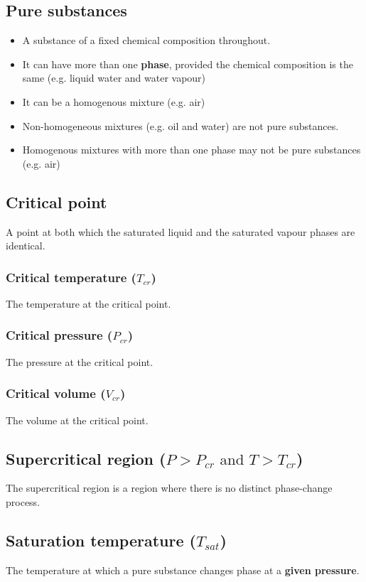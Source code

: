 \documentclass[11pt]{article}
\begin{document}
\subsection{Pure substances}
\label{sec:org8fc514d}
\begin{itemize}
\item A substance of a fixed chemical composition throughout.
\item It can have more than one \textbf{phase}, provided the chemical composition is the same (e.g. liquid water and water vapour)
\item It can be a homogenous mixture (e.g. air)
\item Non-homogeneous mixtures (e.g. oil and water) are not pure substances.
\item Homogenous mixtures with more than one phase may not be pure substances (e.g. air)
\end{itemize}
\subsection{Critical point}
\label{sec:org97a346b}
A point at both which the saturated liquid and the saturated vapour phases are identical.
\subsubsection{Critical temperature (\(T_{cr}\))}
\label{sec:orgc7aa09b}
The temperature at the critical point.
\subsubsection{Critical pressure (\(P_{cr}\))}
\label{sec:orgc59d4f8}
The pressure at the critical point.
\subsubsection{Critical volume (\(V_{cr}\))}
\label{sec:org0eee1e1}
The volume at the critical point.
\subsection{Supercritical region (\(P > P_{cr} \text{ and } T > T_{cr}\))}
\label{sec:orgb3f2439}
The supercritical region is a region where there is no distinct phase-change process.
\subsection{Saturation temperature (\(T_{sat}\))}
\label{sec:org5f23842}
The temperature at which a pure substance changes phase at a \textbf{given pressure}.
\end{document}
